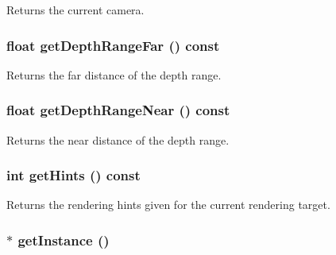 Returns the current camera. \hypertarget{classm3g_1_1Graphics3D_c8c185b99073215202d2e35723f5c470}{
\subsubsection[{getDepthRangeFar}]{\setlength{\rightskip}{0pt plus 5cm}float getDepthRangeFar () const}}
\label{classm3g_1_1Graphics3D_c8c185b99073215202d2e35723f5c470}


Returns the far distance of the depth range. \hypertarget{classm3g_1_1Graphics3D_60bc116f673bf2782de2df3eebfb2c92}{
\subsubsection[{getDepthRangeNear}]{\setlength{\rightskip}{0pt plus 5cm}float getDepthRangeNear () const}}
\label{classm3g_1_1Graphics3D_60bc116f673bf2782de2df3eebfb2c92}


Returns the near distance of the depth range. \hypertarget{classm3g_1_1Graphics3D_5837234a23dc5f46d3adec17f521b58e}{
\subsubsection[{getHints}]{\setlength{\rightskip}{0pt plus 5cm}int getHints () const}}
\label{classm3g_1_1Graphics3D_5837234a23dc5f46d3adec17f521b58e}


Returns the rendering hints given for the current rendering target. \hypertarget{classm3g_1_1Graphics3D_da6d71754bfe755dd8204a9332e9ed47}{
\subsubsection[{getInstance}]{ $\ast$ getInstance ()}}
\label{classm3g_1_1Graphics3D_da6d71754bfe755dd8204a9332e9ed47}


